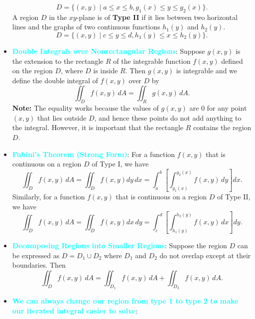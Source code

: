 \documentclass{report}
\begin{document}
\begin{itemize}
            \[ D = \{(x,y) \mid a \leq x \leq b, g_1(x) \leq y \leq g_2(x)\}. \]
            \bigbreak \noindent 
            A region \(D\) in the \(xy\)-plane is of \textbf{Type II} if it lies between two horizontal lines and the graphs of two continuous functions \(h_1(y)\) and \(h_2(y)\).
            \[ D = \{(x,y) \mid c \leq y \leq d, h_1(y) \leq x \leq h_2(y)\}. \]
            \bigbreak \noindent 
        \item \textbf{\textcolor{cyan}{Double Integrals over Nonrectangular Regions}}:
            Suppose \(g(x,y)\) is the extension to the rectangle \(R\) of the integrable function \(f(x,y)\) defined on the region \(D\), where \(D\) is inside \(R\). Then \(g(x,y)\) is integrable and we define the double integral of \(f(x,y)\) over \(D\) by
            \[
                \iint_{D} f(x,y) \, dA = \iint_{R} g(x,y) \, dA.
            \]
            \bigbreak \noindent 
            \textbf{Note:} The equality works because the values of \(g(x,y)\) are \(0\) for any point \((x,y)\) that lies outside \(D\), and hence these points do not add anything to the integral. However, it is important that the rectangle \(R\) contains the region \(D\).
        \item \textbf{\textcolor{cyan}{Fubini’s Theorem (Strong Form)}}:
            For a function \(f(x,y)\) that is continuous on a region \(D\) of Type I, we have
            \begin{equation}
                \iint_{D} f(x,y) \, dA = \iint_{D}f(x,y)dy\, dx= \int_{a}^{b} \left[ \int_{g_1(x)}^{g_2(x)} f(x,y) \, dy \right] dx.
            \end{equation}
            Similarly, for a function \(f(x,y)\) that is continuous on a region \(D\) of Type II, we have
            \begin{equation}
                \iint_{D} f(x,y) \, dA  = \iint_{D}f(x,y)dx\, dy= \int_{c}^{d} \left[ \int_{h_1(y)}^{h_2(y)} f(x,y) \, dx \right] dy.
            \end{equation}
        \item \textbf{\textcolor{cyan}{Decomposing Regions into Smaller Regions}}:
            Suppose the region \(D\) can be expressed as \(D = D_1 \cup D_2\) where \(D_1\) and \(D_2\) do not overlap except at their boundaries. Then
            \[
                \iint_{D} f(x,y) \, dA = \iint_{D_1} f(x,y) \, dA + \iint_{D_2} f(x,y) \, dA.
            \]
        \item \textbf{\textcolor{cyan}{We can always change our region from type 1 to type 2 to make our iterated integral easier to solve}}:

\end{itemize}
\end{document}
